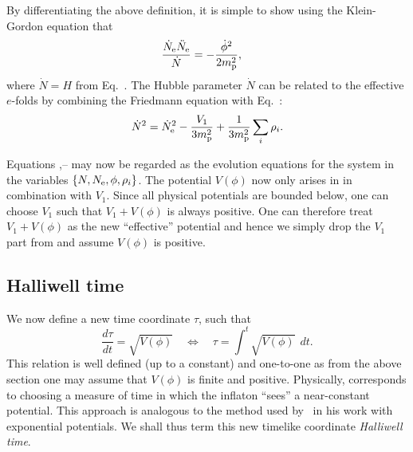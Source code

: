 By differentiating the above definition, it is simple to show using
the Klein-Gordon equation  that
%
\begin{align}
  \frac{\dot{N}_\mathrm{e} \ddot{N}_\mathrm{e}}{\dot{N}}  
  &=
  -\frac{\dot{\phi}^2}{2m_{\mathrm{p}}^2},
  \label{eqn:Raychaudhuri_c}
\end{align}
%
where $\dot{N}=H$ from Eq.\ . The Hubble
parameter $\dot{N}$ can be related to the effective $e$-folds by
combining the Friedmann equation  with
Eq.\ :
%
\begin{equation}
  \dot{N}^2 = \dot{N}_\mathrm{e}^2 -\frac{V_1}{3m_{\mathrm{p}}^2} + \frac{1}{3m_{\mathrm{p}}^2}\sum_i\rho_i.
  \label{eqn:N_H_relation}
\end{equation}
%

Equations
,-- may
now be regarded as the evolution equations for the system in the
variables $\{N,N_\mathrm{e},\phi,\rho_i\}$.  The potential $V(\phi)$ now
only arises in  in combination with $V_1$.
Since all physical potentials are bounded below, one can choose $V_1$
such that $V_1+V(\phi)$ is always positive. One can therefore treat
$V_1+V(\phi)$ as the new ``effective'' potential and hence we simply
drop the $V_1$ part from  and assume $V(\phi)$
is positive.

\subsection{Halliwell time}
We now define a new time coordinate $\tau$, such that
%
\begin{equation}
  \frac{d\tau}{dt} 
  = 
  \sqrt{V(\phi)} \quad\Leftrightarrow\quad \tau 
  = 
  \int^t \sqrt{V(\phi)}\:\: dt.
  \label{eqn:tau_def}
\end{equation}
%
This relation is well defined (up to a constant) and one-to-one as
from the above section one may assume that $V(\phi)$ is finite and
positive. Physically,  corresponds to choosing a
measure of time in which the inflaton ``sees'' a near-constant
potential. This approach is analogous to the method used
by~\citet{halliwell_scalar_1987} in his work with exponential
potentials. We shall thus term this new timelike coordinate {\em
Halliwell time}.

